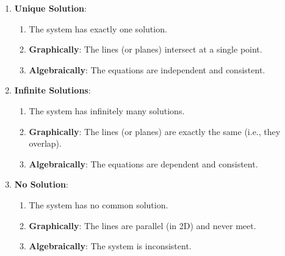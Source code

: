 \begin{enumerate}[itemsep=0.3cm]

\item \textbf{Unique Solution}:
\begin{enumerate}
    \item The system has exactly one solution.
    \hfill \cite{common/online/chatgpt}

    \item \textbf{Graphically}: The lines (or planes) intersect at a single point.
    \hfill \cite{common/online/chatgpt}

    \item \textbf{Algebraically}: The equations are independent and consistent.
    \hfill \cite{common/online/chatgpt}
\end{enumerate}

\item \textbf{Infinite Solutions}:
\begin{enumerate}
    \item The system has infinitely many solutions.
    \hfill \cite{common/online/chatgpt}

    \item \textbf{Graphically}: The lines (or planes) are exactly the same (i.e., they overlap).
    \hfill \cite{common/online/chatgpt}

    \item \textbf{Algebraically}: The equations are dependent and consistent.
    \hfill \cite{common/online/chatgpt}
\end{enumerate}

\item \textbf{No Solution}:
\begin{enumerate}
    \item The system has no common solution.
    \hfill \cite{common/online/chatgpt}

    \item \textbf{Graphically}: The lines are parallel (in 2D) and never meet.
    \hfill \cite{common/online/chatgpt}

    \item \textbf{Algebraically}: The system is inconsistent.
    \hfill \cite{common/online/chatgpt}
\end{enumerate}

\end{enumerate}












